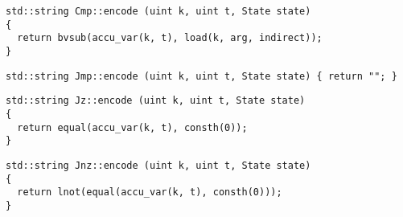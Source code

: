 
\begin{lstlisting}[style=c++,aboveskip=-\encodeskip,belowskip=\encodeskip]
std::string Cmp::encode (uint k, uint t, State state)
{
  return bvsub(accu_var(k, t), load(k, arg, indirect));
}
\end{lstlisting}


\begin{lstlisting}[style=c++,aboveskip=-\encodeskip,belowskip=\encodeskip]
std::string Jmp::encode (uint k, uint t, State state) { return ""; }
\end{lstlisting}


\begin{lstlisting}[style=c++,aboveskip=-\encodeskip,belowskip=\encodeskip]
std::string Jz::encode (uint k, uint t, State state)
{
  return equal(accu_var(k, t), consth(0));
}
\end{lstlisting}


\begin{lstlisting}[style=c++,aboveskip=-\encodeskip,belowskip=\encodeskip]
std::string Jnz::encode (uint k, uint t, State state)
{
  return lnot(equal(accu_var(k, t), consth(0)));
}
\end{lstlisting}

